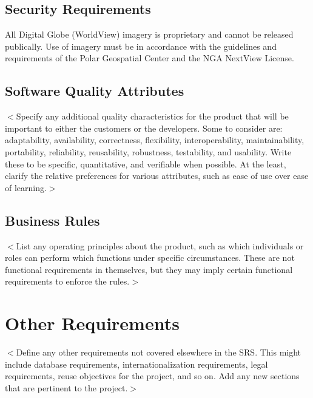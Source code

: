 \documentclass{scrreprt}
\begin{document}
\section{Security Requirements}

All Digital Globe (WorldView) imagery is proprietary and cannot be released publically. 
Use of imagery must be in accordance with the guidelines and requirements of the Polar 
Geospatial Center and the NGA NextView License. 

\section{Software Quality Attributes}
$<$Specify any additional quality characteristics for the product that will be 
important to either the customers or the developers. Some to consider are: 
adaptability, availability, correctness, flexibility, interoperability, 
maintainability, portability, reliability, reusability, robustness, testability, 
and usability. Write these to be specific, quantitative, and verifiable when 
possible. At the least, clarify the relative preferences for various attributes, 
such as ease of use over ease of learning.$>$

\section{Business Rules}
$<$List any operating principles about the product, such as which individuals or 
roles can perform which functions under specific circumstances. These are not 
functional requirements in themselves, but they may imply certain functional 
requirements to enforce the rules.$>$


\chapter{Other Requirements}
$<$Define any other requirements not covered elsewhere in the SRS. This might 
include database requirements, internationalization requirements, legal 
requirements, reuse objectives for the project, and so on. Add any new sections 
that are pertinent to the project.$>$
\end{document}
